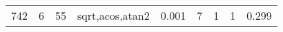 \begin{table}
\begin{center}
\begin{tabular}{|l||r|r|r||r|r|r|r|r|}
742 & 6 & 55 & sqrt,acos,atan2 & 0.001 & 7 & 1 & 1 & 0.299 \\

\end{tabular}
\end{center}
\end{table}
